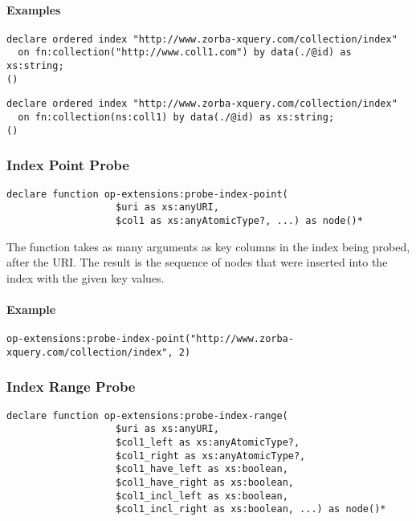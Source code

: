 \documentclass[]{article}
\begin{document}
\paragraph{Examples}
\begin{verbatim}
declare ordered index "http://www.zorba-xquery.com/collection/index" 
  on fn:collection("http://www.coll1.com") by data(./@id) as xs:string;
()
\end{verbatim}

\begin{verbatim}
declare ordered index "http://www.zorba-xquery.com/collection/index" 
  on fn:collection(ns:coll1) by data(./@id) as xs:string;
()
\end{verbatim}


\subsubsection{Index Point Probe}
\begin{verbatim}
declare function op-extensions:probe-index-point(
                   $uri as xs:anyURI, 
                   $col1 as xs:anyAtomicType?, ...) as node()*
\end{verbatim}

\noindent
The function takes as many arguments as key columns in the index being probed, after the URI. The result is the sequence of nodes that were inserted into the index with the given key values.

\paragraph{Example}
\begin{verbatim}
op-extensions:probe-index-point("http://www.zorba-xquery.com/collection/index", 2)
\end{verbatim}

\subsubsection{Index Range Probe}
\begin{verbatim}
declare function op-extensions:probe-index-range(
                   $uri as xs:anyURI,
                   $col1_left as xs:anyAtomicType?,
                   $col1_right as xs:anyAtomicType?,
                   $col1_have_left as xs:boolean,
                   $col1_have_right as xs:boolean,
                   $col1_incl_left as xs:boolean,
                   $col1_incl_right as xs:boolean, ...) as node()*
\end{verbatim}
\end{document}

